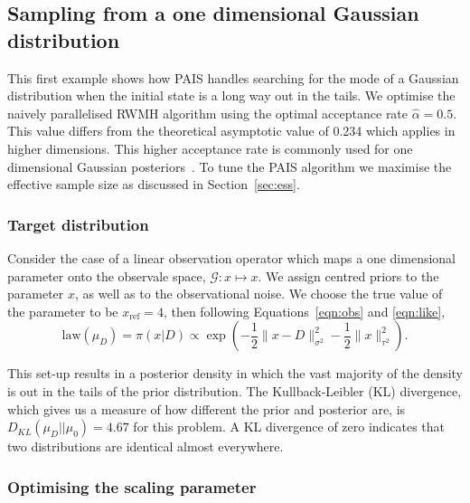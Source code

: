 \documentclass[final]{siamltex}
\newcommand{\G}{\mathcal{G}}
\begin{document}

\subsection{Sampling from a one dimensional Gaussian distribution}
\label{sec:problem 1}

This first example shows how PAIS handles searching for the mode of a
Gaussian distribution when the initial state is a long way out in the
tails. We optimise the
naively parallelised RWMH algorithm using the optimal acceptance rate
$\hat{\alpha} = 0.5$. This value differs from the theoretical
asymptotic value of 0.234 which applies in higher dimensions. This
higher acceptance rate is commonly used for one dimensional Gaussian
posteriors~\cite{rosenthal2011optimal}. To tune the
PAIS algorithm we maximise the effective sample size as
discussed in Section~\ref{sec:ess}.


\subsubsection{Target distribution}

Consider the case of a linear observation operator which maps a one
dimensional parameter onto the observale space, $\G\colon x \mapsto
x$. We assign centred priors to the parameter $x$, as well as to the
observational noise. We choose the true value of the parameter to be
$x_\text{ref} = 4$, then following Equations~\eqref{eqn:obs} and
\eqref{eqn:like},
\begin{equation}\label{eqn:Gaussian posterior}
	\text{law}(\mu_D) = \pi(x|D) \propto \exp\left(-\frac{1}{2}\big\|x
	 - D\big\|^2_{\sigma^2} - \frac{1}{2}\big\|x\big\|^2_{\tau^2}\right).
\end{equation}

This set-up results in a posterior density in which the vast majority
of the density is out in the tails of the
prior distribution. The Kullback-Leibler (KL)
divergence, which gives us a measure of how different the prior and
posterior are, is $D_{KL}(\mu_D || \mu_0) = 4.67$ for this
problem. A KL divergence of zero indicates that two distributions are
identical almost everywhere.


\subsubsection{Optimising the scaling parameter}\label{sec:Optimal values P1}
\end{document}

